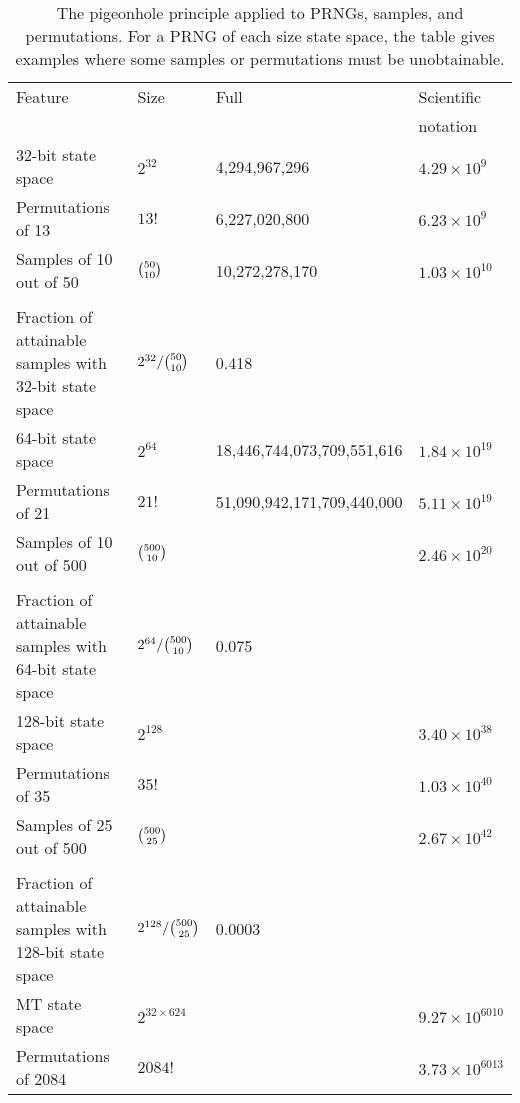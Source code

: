 \documentclass[graybox]{svmult}
\begin{document}
\begin{table}
\caption{The pigeonhole principle applied to PRNGs, samples, and permutations.
For a PRNG of each size state space, the table gives examples where some samples or permutations 
must be unobtainable.}
\label{tab:pigeonhole}       
\begin{tabular}[h]{p{4.7cm}p{2.4cm}p{3.9cm}p{2cm}}
\hline\noalign{\smallskip}
Feature & Size & Full & Scientific \\
            &        &       & notation  \\
\noalign{\smallskip}\svhline\noalign{\smallskip}
32-bit state space & $2^{32}$ & 4,294,967,296 & $4.29 \times 10^9$ \\
Permutations of 13 & $13!$ & 6,227,020,800 & $6.23 \times 10^9$ \\
Samples of 10 out of 50 & $\tbinom{50}{10}$ &  10,272,278,170 & $1.03\times 10^{10} $ \\
{}\\
Fraction of attainable samples with 32-bit state space & ${2^{32}}/{\tbinom{50}{10}}$   & 0.418 & \\
\noalign{\smallskip}\svhline\noalign{\smallskip}
64-bit state space & $2^{64}$ & 18,446,744,073,709,551,616 & $1.84 \times 10^{19}$ \\
Permutations of 21 & $21!$ &  51,090,942,171,709,440,000 & $5.11 \times 10^{19}$ \\
Samples of 10 out of 500 & $\tbinom{500}{10}$ & & $2.46 \times 10^{20}$ \\
{}\\
Fraction of attainable samples with 64-bit state space & ${2^{64}}/{\tbinom{500}{10}}$ &  0.075 & \\
\noalign{\smallskip}\svhline\noalign{\smallskip}
128-bit state space & $2^{128}$ &  & $3.40 \times 10^{38}$ \\
Permutations of 35 & $35!$ &   & $1.03 \times 10^{40}$ \\
Samples of 25 out of 500 & $\tbinom{500}{25}$ & & $2.67 \times 10^{42}$ \\
{}\\
Fraction of attainable samples with 128-bit state space & ${2^{128}}/{\tbinom{500}{25}}$ &  0.0003 & \\
\noalign{\smallskip}\svhline\noalign{\smallskip}
MT state space & $2^{32 \times 624}$ & & $9.27\times 10^{6010}$ \\
Permutations of 2084 & $2084!$ &   & $3.73 \times 10^{6013}$ \\

\end{tabular}
\end{table}
\end{document}
